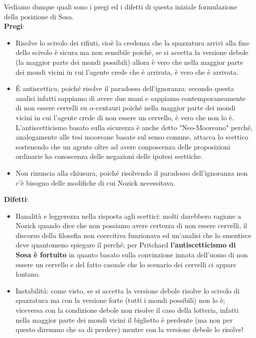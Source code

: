 \documentclass[10pt,a4paper]{article}
\begin{document}
Vediamo dunque quali sono i pregi ed i difetti di questa iniziale formulazione della posizione di Sosa. \\
\textbf{Pregi}:
\begin{itemize}
	\item Risolve lo scivolo dei rifiuti, cioè la credenza che la spazzatura arrivi alla fine dello scivolo è sicura ma non sensibile poiché, se si accetta la versione debole (la maggior parte dei mondi possibili) allora è vero che nella maggior parte dei mondi vicini in cui l'agente crede che è arrivata, è vero che è arrivata.  
	\item \'E antiscettica, poiché risolve il paradosso dell'ignoranza: secondo questa analisi infatti sappiamo di avere due mani e sappiamo contemporaneamente di non essere cervelli su $\alpha$-centauri poiché nella maggior parte dei mondi vicini in cui l'agente  crede di non essere un cervello, è vero che non lo è. L'antiscetticismo basato sulla sicurezza è anche detto "Neo-Mooreano" perché, analogamente alle tesi mooreane basate sul senso comune, attacca lo scettico sostenendo che un agente oltre ad avere conposcenza delle proposizioni ordinarie ha conoscenza delle negazioni delle ipotesi scettiche.
	\item Non rinuncia alla chiusura, poiché risolvendo il paradosso dell'ignoranza non c'è bisogno delle modifiche di cui Nozick necessitava.
\end{itemize}
\textbf{Difetti}:
\begin{itemize}
	\item Banalità e leggerezza nella risposta agli scettici: molti darebbero ragione a Nozick quando dice che non possiamo avere certezza di non essere cervelli, il discorso della filosofia non coercitiva funzionava ed un'analisi che lo smentisce deve quantomeno spiegare il perché; per Pritchard \textbf{l'antiscetticismo di Sosa è fortuito} in quanto basato sulla convinzione innata dell'uomo di non essere un cervello e del fatto casuale che lo scenario dei cervelli ci appare lontano.
	\item Instabilità: come visto, se si accetta la versione debole risolve lo scivolo di spazzatura ma con la versione forte (tutti i mondi possibili) non lo è; viceversa con la condizione debole non risolve il caso della lotteria, infatti nella maggior parte dei mondi vicini il biglietto è perdente (ma non per questo diremmo che sa di perdere) mentre con la versione debole lo risolve!
\end{itemize}
\end{document}
